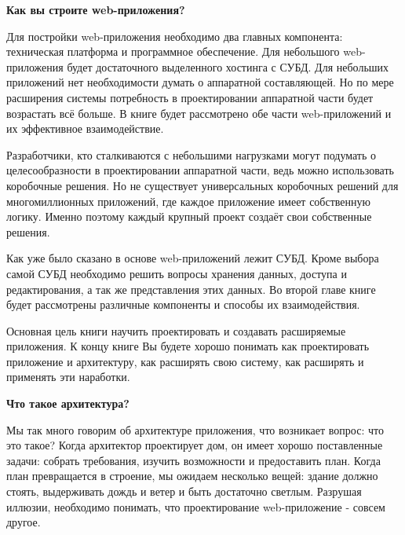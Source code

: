 \textbf{Как вы строите web-приложения?}

Для постройки web-приложения необходимо два главных компонента: техническая платформа и программное обеспечение. Для небольшого web-приложения будет достаточного выделенного хостинга с СУБД. Для небольших приложений нет необходимости думать о аппаратной составляющей. Но по мере расширения системы потребность в проектировании аппаратной части будет возрастать всё больше. В книге будет рассмотрено обе части web-приложений и их эффективное взаимодействие.


Разработчики, кто сталкиваются с небольшими нагрузками могут подумать о целесообразности в проектировании аппаратной части, ведь можно использовать коробочные решения. Но не существует универсальных коробочных решений для многомиллионных приложений, где  каждое приложение имеет собственную логику. Именно поэтому каждый крупный проект создаёт свои собственные решения.

Как уже было сказано в основе web-приложений лежит СУБД. Кроме выбора самой СУБД необходимо решить вопросы хранения данных, доступа и редактирования, а так же представления этих данных. Во второй главе книге будет рассмотрены различные компоненты и способы их взаимодействия.

Основная цель книги научить проектировать и создавать расширяемые приложения. К концу книге Вы будете хорошо понимать как проектировать приложение и архитектуру, как расширять свою систему, как расширять и применять эти наработки.



\textbf{Что такое архитектура?}

Мы так много говорим об архитектуре приложения, что возникает вопрос: что это такое? Когда архитектор проектирует дом, он имеет хорошо поставленные задачи: собрать требования, изучить возможности и предоставить план. Когда план превращается в строение, мы ожидаем  несколько вещей: здание должно  стоять, выдерживать дождь и ветер и быть достаточно светлым. Разрушая иллюзии, необходимо понимать, что проектирование web-приложение - совсем другое.

